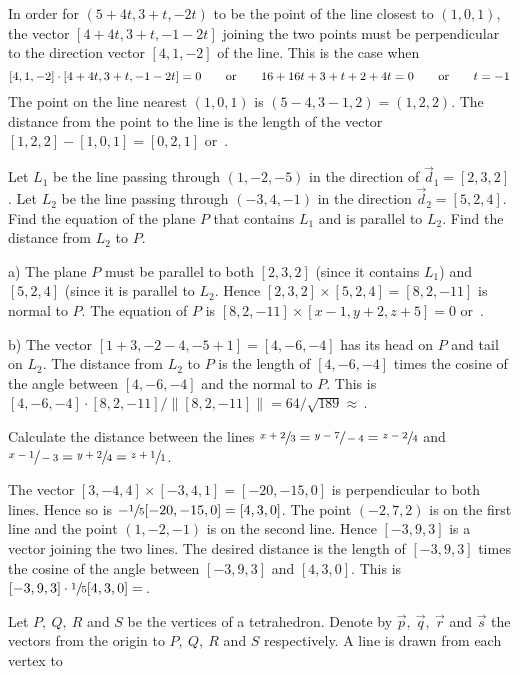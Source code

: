 {In order for $(5+4t,3+t,-2t)$ to be the point of the line closest to
$(1,0,1)$, the vector $[4+4t,3+t,-1-2t]$ joining the two points 
must be perpendicular to the direction vector $[4,1,-2]$ of the line.
This is the case when
$$
[4,1,-2]\cdot [4+4t,3+t,-1-2t]=0\qquad\hbox{or}\qquad
16+16t+3+t+2+4t=0\qquad\hbox{or}\qquad t=-1
$$
The point on the line nearest $(1,0,1)$ is $(5-4,3-1,2)=(1,2,2)$. The distance
from the point to the line is the length of the vector 
$[1,2,2]-[1,0,1]=[0,2,1]$ or $\,$.
\medskip
\item{\next} Let $L_1$ be the line passing through $(1,-2,-5)$ in the direction of $\vec d_1=[2,3,2]$. Let $L_2$ be the line passing through
$(-3,4,-1)$ in the direction $\vec d_2=[5,2,4]$.
 Find the equation of the plane $P$ that contains $L_1$
and is parallel to $L_2$. 
 Find the distance from $L_2$ to $P$.
\smallskip
\item{}\soln a) The plane $P$ must be parallel to both $[2,3,2]$ (since it 
contains $L_1$) and $[5,2,4]$ (since it is parallel to $L_2$.
Hence $[2,3,2]\times [5,2,4]=[8,2,-11]$ is normal to $P$. The equation
of $P$ is $[8,2,-11]\times[x-1,y+2,z+5]=0$ or $\,$. 
\item{}b) The vector $[1+3,-2-4,-5+1]=[4,-6,-4]$ has its head on
$P$ and tail on $L_2$. The distance from $L_2$ to $P$ is the length
of $[4,-6,-4]$ times the cosine of the angle between $[4,-6,-4]$
and the normal to $P$. This is $[4,-6,-4]\cdot[8,2,-11]/\|[8,2,-11]\|
=64/\sqrt{189}\approx$$\,$.
\medskip\goodbreak
\item{\next} Calculate the distance between the lines 
$\sfrac{x+2}{3}=\sfrac{y-7}{-4}=\sfrac{z-2}{4}$ and $\sfrac{x-1}{-3}=\sfrac{y+2}{4}=\sfrac{z+1}{1}$.
\smallskip
\item{}\soln The vector $[3,-4,4]\times[-3,4,1]=[-20,-15,0]$ is perpendicular to
both lines. Hence so is $-\sfrac{1}{5}[-20,-15,0]=[4,3,0]$. The point
$(-2,7,2)$ is on the first line and the point $(1,-2,-1)$ is on the second
line. Hence $[-3,9,3]$ is a vector joining the two lines. The desired
distance is the length of $[-3,9,3]$ times the cosine of the angle
between $[-3,9,3]$ and $[4,3,0]$. This is $[-3,9,3]\cdot\sfrac{1}{5}[4,3,0]=$$\,$.
\medskip
\item{\next} Let $P,\ Q,\ R$ and $S$ be the vertices of a tetrahedron.
Denote by $\vec p,\ \vec q,\ \vec r$ and $\vec s$ the vectors from the origin
to $P,\ Q,\ R$ and $S$ respectively. A line is drawn from each vertex to
}
